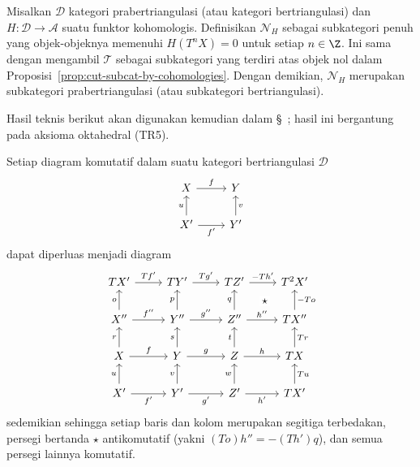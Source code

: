 \begin{contoh}\label{eg:subcat-N-H}
	Misalkan $\mathcal{D}$ kategori prabertriangulasi (atau kategori
	bertriangulasi) dan $H: \mathcal{D} \to \mathcal{A}$ suatu funktor
	kohomologis. Definisikan $\mathcal{N}_H$ sebagai subkategori penuh yang
	objek-objeknya memenuhi $H(T^n X) = 0$ untuk setiap $n \in \Z$. Ini sama
	dengan mengambil $\mathcal{T}$ sebagai subkategori yang terdiri atas objek
	nol dalam Proposisi~\ref{prop:cut-subcat-by-cohomologies}. Dengan demikian,
	$\mathcal{N}_H$ merupakan subkategori prabertriangulasi (atau subkategori
	bertriangulasi).
\end{contoh}

Hasil teknis berikut akan digunakan kemudian dalam
\S~; hasil ini bergantung
pada aksioma oktahedral (TR5).

\begin{lema}[J.-L.\ Verdier]\label{prop:triangulated-9-diag}
	Setiap diagram komutatif dalam suatu kategori bertriangulasi $\mathcal{D}$
	\[\begin{tikzcd}
		X \arrow[r, "f"] & Y \\
		X' \arrow[r, "{f'}"'] \arrow[u, "u"] & Y' \arrow[u, "v"']
	\end{tikzcd}\]
	dapat diperluas menjadi diagram
	\[\begin{tikzcd}
		TX' \arrow[r, "{Tf'}"] & TY' \arrow[r, "{Tg'}"] & TZ' \arrow[r, "{- Th'}"] & T^2 X' \arrow[phantom, ld, "\star" description] \\
		X'' \arrow[u, "o"] \arrow[r, "{f''}"] & Y'' \arrow[u, "p"] \arrow[r, "{g''}"] & Z'' \arrow[u, "q"] \arrow[r, "h''"] & TX'' \arrow[u, "{-To}"'] \\
		X \arrow[r, "f"] \arrow[u, "r"] & Y \arrow[r, "g"] \arrow[u, "s"] & Z \arrow[r, "h"] \arrow[u, "t"] & TX \arrow[u, "Tr"'] \\
		X' \arrow[r, "{f'}"'] \arrow[u, "u"] & Y' \arrow[r, "{g'}"'] \arrow[u, "v"] & Z' \arrow[r, "{h'}"'] \arrow[u, "w"] & TX' \arrow[u, "Tu"']
	\end{tikzcd}\]
	sedemikian sehingga setiap baris dan kolom merupakan segitiga terbedakan,
	persegi bertanda $\star$ antikomutatif (yakni
	$(To) h'' = -(Th') q$), dan semua persegi lainnya komutatif.
\end{lema}

